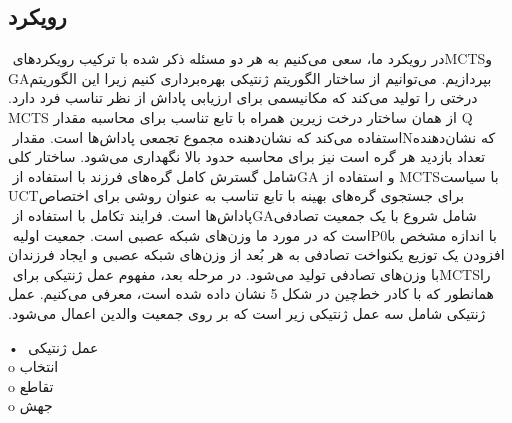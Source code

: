 \documentclass[11pt]{article}
\begin{document}
\begin{multicols}{2}
		\section{رویکرد}
		در رویکرد ما، سعی می‌کنیم به هر دو مسئله ذکر شده با ترکیب ‏رویکردهای ‏MCTS‏ و ‏GA‏ بپردازیم. می‌توانیم از ساختار الگوریتم ‏ژنتیکی بهره‌برداری کنیم زیرا این الگوریتم درختی را تولید می‌کند که ‏مکانیسمی برای ارزیابی پاداش از نظر تناسب فرد دارد. ‏MCTS‏ از همان ‏ساختار درخت زیرین همراه با تابع تناسب برای محاسبه مقدار ‏Q‏ استفاده ‏می‌کند که نشان‌دهنده مجموع تجمعی پاداش‌ها است. مقدار ‏N‏ که ‏نشان‌دهنده تعداد بازدید هر گره است نیز برای محاسبه حدود بالا ‏نگهداری می‌شود. ساختار کلی شامل گسترش کامل گره‌های فرزند با ‏استفاده از ‏GA‏ و استفاده از ‏MCTS‏ با سیاست ‏UCT‏ برای جستجوی ‏گره‌های بهینه با تابع تناسب به عنوان روشی برای اختصاص پاداش‌ها ‏است.‏
		فرایند تکامل با استفاده از ‏GA‏ شامل شروع با یک جمعیت ‏تصادفی است که در مورد ما وزن‌های شبکه عصبی است. جمعیت اولیه ‏P0‎‏ با اندازه مشخص با افزودن یک توزیع یکنواخت تصادفی به هر بُعد از ‏وزن‌های شبکه عصبی و ایجاد فرزندان با وزن‌های تصادفی تولید ‏می‌شود.‏
		در مرحله بعد، مفهوم عمل ژنتیکی برای ‏MCTS‏ را همانطور که با ‏کادر خط‌چین در شکل 5 نشان داده شده است، معرفی می‌کنیم. عمل ‏ژنتیکی شامل سه عمل ژنتیکی زیر است که بر روی جمعیت والدین ‏اعمال می‌شود.‏
		
		•	عمل ژنتیکی ‏
		\\o	انتخاب
		\\o	تقاطع
		\\o	جهش
		

\end{multicols}
\end{document}
